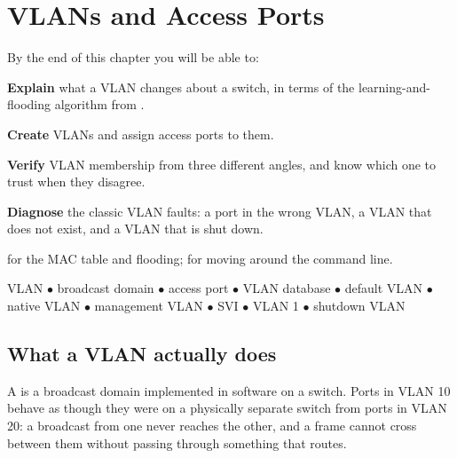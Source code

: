 \chapter{VLANs and Access Ports}\label{ch:vlans}

\begin{outcomes}
By the end of this chapter you will be able to:
\begin{tight}
  \item \textbf{Explain} what a VLAN changes about a switch, in terms of the
        learning-and-flooding algorithm from .
  \item \textbf{Create} VLANs and assign access ports to them.
  \item \textbf{Verify} VLAN membership from three different angles, and know
        which one to trust when they disagree.
  \item \textbf{Diagnose} the classic VLAN faults: a port in the wrong VLAN, a
        VLAN that does not exist, and a VLAN that is shut down.
\end{tight}
\end{outcomes}

\begin{prereq}
 for the MAC table and flooding;  for moving around
the command line.
\end{prereq}

\begin{keyterms}
VLAN $\bullet$ broadcast domain $\bullet$ access port $\bullet$ VLAN database
$\bullet$ default VLAN $\bullet$ native VLAN $\bullet$ management VLAN $\bullet$
SVI $\bullet$ VLAN 1 $\bullet$ shutdown VLAN
\end{keyterms}

\section{What a VLAN actually does}

\begin{definitionbox}[VLAN]
A  is a broadcast domain implemented in software on a switch. Ports in
VLAN 10 behave as though they were on a physically separate switch from ports in
VLAN 20: a broadcast from one never reaches the other, and a frame cannot cross
between them without passing through something that routes.
\end{definitionbox}

